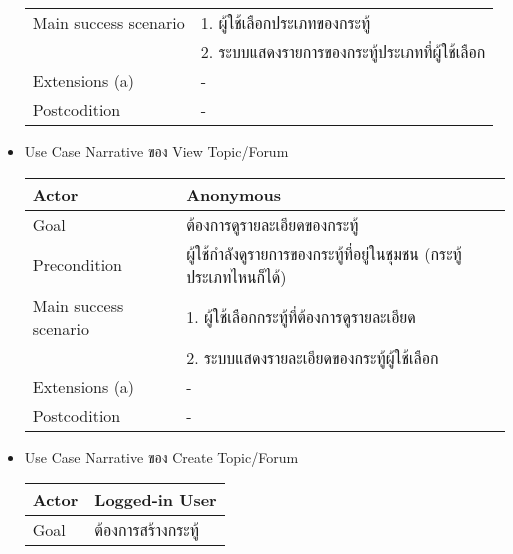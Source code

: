 \begin{itemize}
\begin{table}[!h]
\begin{tabular}{|l|l|}
                  Main success scenario & 1. ผู้ใช้เลือกประเภทของกระทู้                \\
                                        & 2. ระบบแสดงรายการของกระทู้ประเภทที่ผู้ใช้เลือก \\ \hline
                  Extensions (a)        & -                                      \\ \hline
                  Postcodition          & -                                      \\ \hline
              \end{tabular}
          \end{table}
    \item Use Case Narrative ของ View Topic/Forum
          \begin{table}[!h]
              \begin{tabular}{|l|l|} \hline
                  Actor                 & Anonymous                                        \\ \hline
                  Goal                  & ต้องการดูรายละเอียดของกระทู้                          \\ \hline
                  Precondition          & ผู้ใช้กำลังดูรายการของกระทู้ที่อยู่ในชุมชน (กระทู้ประเภทไหนก็ได้) \\ \hline
                  Main success scenario & 1. ผู้ใช้เลือกกระทู้ที่ต้องการดูรายละเอียด                  \\
                                        & 2. ระบบแสดงรายละเอียดของกระทู้ผู้ใช้เลือก               \\ \hline
                  Extensions (a)        & -                                                \\ \hline
                  Postcodition          & -                                                \\ \hline
              \end{tabular}
          \end{table}
    \item Use Case Narrative ของ Create Topic/Forum
          \begin{table}[!h]
              \begin{tabular}{|l|l|} \hline
                  Actor                 & Logged-in User                                   \\ \hline
                  Goal                  & ต้องการสร้างกระทู้                                   \\ \hline

\end{tabular}
\end{table}
\end{itemize}
